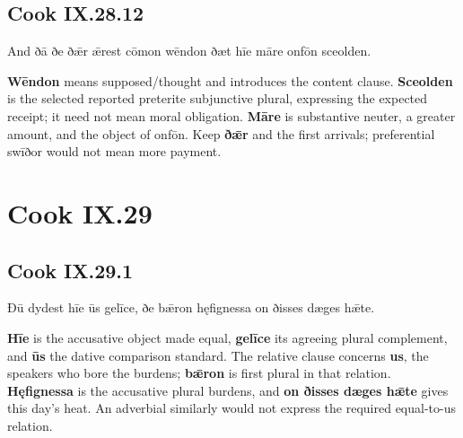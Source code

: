 \subsection*{Cook IX.28.12}

\par\begin{minipage}{\linewidth}\raggedright
And ðā ðe ðǣr ǣrest cōmon wēndon ðæt hīe māre onfōn sceolden.

\textbf{Wēndon} means supposed/\allowbreak{}thought and introduces the content clause. \textbf{Sceolden} is the selected reported preterite subjunctive plural, expressing the expected receipt; it need not mean moral obligation. \textbf{Māre} is substantive neuter, a greater amount, and the object of onfōn. Keep \textbf{ðǣr} and the first arrivals; preferential swīðor would not mean more payment.

\end{minipage}\par\addvspace{4pt}

\section*{Cook IX.29}

\subsection*{Cook IX.29.1}

\par\begin{minipage}{\linewidth}\raggedright
Ðū dydest hīe ūs gelīce, ðe bǣron hęfignessa on ðisses dæges hǣte.

\textbf{Hīe} is the accusative object made equal, \textbf{gelīce} its agreeing plural complement, and \textbf{ūs} the dative comparison standard. The relative clause concerns \textbf{us}, the speakers who bore the burdens; \textbf{bǣron} is first plural in that relation. \textbf{Hęfignessa} is the accusative plural burdens, and \textbf{on ðisses dæges hǣte} gives this day’s heat. An adverbial similarly would not express the required equal-to-us relation.

\end{minipage}\par\addvspace{4pt}

